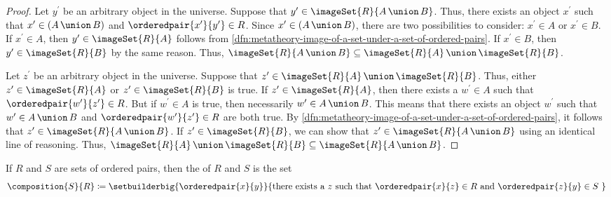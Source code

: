 \begin{proof}
    Let \( y^{\prime} \) be an arbitrary object in the universe.
    Suppose that \( y^{\prime} \in \imageSet{R}{A \,{\union}\, B} \).
    Thus, there exists an object \( x^{\prime} \) such that \( x^{\prime} \in \mleft( A \,{\union}\, B \mright) \) and \( \orderedpair{x^{\prime}}{y^{\prime}} \in R \).
    Since \( x^{\prime} \in \mleft( A \,{\union}\, B \mright) \), there are two possibilities to consider: \( x^{\prime} \in A \) or \( x^{\prime} \in B \).
    If \( x^{\prime} \in A \), then \( y^{\prime} \in \imageSet{R}{A} \) follows from \cref{dfn:metatheory-image-of-a-set-under-a-set-of-ordered-pairs}.
    If \( x^{\prime} \in B \), then \( y^{\prime} \in \imageSet{R}{B} \) by the same reason.
    Thus, \( \imageSet{R}{A \,{\union}\, B} \subseteq \imageSet{R}{A} \,{\union}\, \imageSet{R}{B} \).

    \vspace{0.3cm}
    \noindent
    Let \( z^{\prime} \) be an arbitrary object in the universe.
    Suppose that \( z^{\prime} \in \imageSet{R}{A} \,{\union}\, \imageSet{R}{B} \).
    Thus, either \( z^{\prime} \in \imageSet{R}{A} \) or \( z^{\prime} \in \imageSet{R}{B} \) is true.
    If \( z^{\prime} \in \imageSet{R}{A} \), then there exists a \( w^{\prime} \in A \) such that \( \orderedpair{w^{\prime}}{z^{\prime}} \in R \).
    But if \( w^{\prime} \in A \) is true, then necessarily \( w^{\prime} \in A \,{\union}\, B \).
    This means that there exists an object \( w^{\prime} \) such that \( w^{\prime} \in A \,{\union}\, B \) and \( \orderedpair{w^{\prime}}{z^{\prime}} \in R \) are both
    true.
    By \cref{dfn:metatheory-image-of-a-set-under-a-set-of-ordered-pairs}, it follows that \( z^{\prime} \in \imageSet{R}{A \,{\union}\, B} \).
    If \( z^{\prime} \in \imageSet{R}{B} \), we can show that \( z^{\prime} \in \imageSet{R}{A \,{\union}\, B} \) using an identical line of reasoning.
    Thus, \( \imageSet{R}{A} \,{\union}\, \imageSet{R}{B} \subseteq \imageSet{R}{A \,{\union}\, B} \).
\end{proof}

\begin{dfn}[Composition]
     \label{dfn:metatheory-composition-of-two-sets-of-ordered-pairs}
    If \( R \) and \( S \) are sets of ordered pairs, then the  of \( R \) and \( S \)
    is the set
    \begin{equation*}
        \composition{S}{R} \coloneq \setbuilderbig{\orderedpair{x}{y}}{\text{there exists a \( z \) such that \( \orderedpair{x}{z} \in R \) and \( \orderedpair{z}{y} \in S \) }}
    \end{equation*}
\end{dfn}

